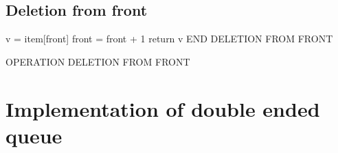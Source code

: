 \subsection{Deletion from front}
\begin{center}
    \begin{algorithm}[H]
        \SetAlgoLined
        \large
        v = item[front]\; 
        front = front + 1\; 
        return v\; 
        END DELETION FROM FRONT\; 
        \caption{OPERATION DELETION FROM FRONT}
    \end{algorithm}
\end{center}

\section{Implementation of double ended queue}
